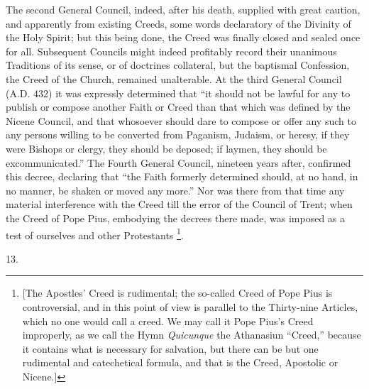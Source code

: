 The second General Council, indeed, after his death, supplied with
great caution, and apparently from existing Creeds, some words
declaratory of the Divinity of the Holy Spirit; but this being done,
the Creed was finally closed and sealed once for all. Subsequent
Councils might indeed profitably record their unanimous Traditions of
its sense, or of doctrines collateral, but the baptismal Confession,
the Creed of the Church, remained unalterable. At the third General
Council (A.D. 432) it was expressly determined
that ``it should not be lawful for any to publish or compose
another Faith or Creed than that which was defined by the Nicene
Council, and that whosoever should dare to compose or offer any such
to any persons willing to be converted from Paganism, Judaism,
or heresy, if they were Bishops or clergy, they should be deposed; if
laymen, they should be excommunicated.'' The Fourth General
Council, nineteen years after, confirmed this decree, declaring that
``the Faith formerly determined should, at no hand, in no manner,
be shaken or moved any more.'' Nor was there from that time any
material interference with the Creed till the error of the Council of
Trent; when the Creed of Pope Pius, embodying the decrees there made,
was imposed as a test of ourselves and other Protestants \footnote{[The Apostles' Creed is rudimental; the
so-called Creed of Pope Pius is controversial, and in this point of
view is parallel to the Thirty-nine Articles, which no one would call
a creed. We may call it Pope Pius's Creed improperly, as we call the
Hymn \emph{Quicunque} the Athanasiun ``Creed,'' because it
contains what is necessary for salvation, but there can be but one
rudimental and catechetical formula, and that is the Creed, Apostolic
or Nicene.]}.

13.

